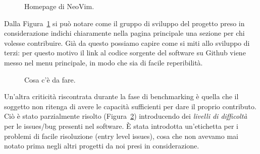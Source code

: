 \documentclass[12pt]{article} %
\begin{document}
\begin{figure}[H]
\caption{Homepage di NeoVim.}
\label{fig:buonesempio1}
\end{figure}

Dalla Figura~\ref{fig:buonesempio1} si pu\`o notare come il gruppo di sviluppo del progetto preso in considerazione indichi chiaramente nella pagina principale una sezione per chi volesse contribuire. Gi\`a da questo possiamo capire come si miti allo sviluppo di terzi: per questo motivo il link al codice sorgente del software su Github viene messo nel menu principale, in modo che sia di facile reperibilit\`a.

\begin{figure}[H]
\caption{Cosa c'\`e da fare.}
\label{fig:buonesempio2}
\end{figure}

Un'altra criticit\`a riscontrata durante la fase di benchmarking \`e quella che il soggetto non ritenga di avere le capacit\`a sufficienti per dare il proprio contributo.\\
Ci\`o \`e stato parzialmente risolto (Figura~\ref{fig:buonesempio2}) introducendo dei \emph{livelli di difficolt\`a} per le issues/bug presenti nel software. \`E stata introdotta un'etichetta per i problemi di facile risoluzione (entry level issues), cosa che non avevamo mai notato prima negli altri progetti da noi presi in considerazione.
\end{document}
